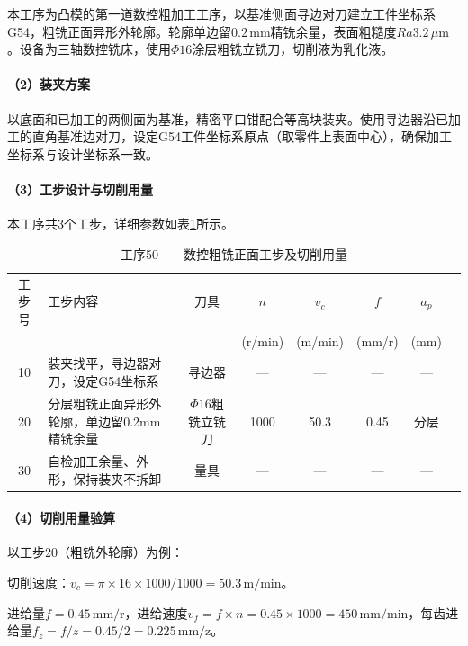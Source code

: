 \documentclass{xautCADreport}
\begin{document}
本工序为凸模的第一道数控粗加工工序，以基准侧面寻边对刀建立工件坐标系G54，粗铣正面异形外轮廓。轮廓单边留$0.2\,\mathrm{mm}$精铣余量，表面粗糙度$Ra3.2\,\mu\mathrm{m}$。设备为三轴数控铣床，使用$\Phi16$涂层粗铣立铣刀，切削液为乳化液。

\paragraph{（2）装夹方案}

以底面和已加工的两侧面为基准，精密平口钳配合等高块装夹。使用寻边器沿已加工的直角基准边对刀，设定G54工件坐标系原点（取零件上表面中心），确保加工坐标系与设计坐标系一致。

\paragraph{（3）工步设计与切削用量}

本工序共3个工步，详细参数如表\ref{tab:op50_punch}所示。

\begin{table}[H]
  \centering
  \caption{工序50——数控粗铣正面工步及切削用量}
  \label{tab:op50_punch}
  \small
  \setlength{\tabcolsep}{5pt}
  \begin{tabular}{cp{4cm}cccccc}
    \toprule
    工步号 & 工步内容 & 刀具 & \multicolumn{1}{c}{$n$} & \multicolumn{1}{c}{$v_c$} & \multicolumn{1}{c}{$f$} & \multicolumn{1}{c}{$a_p$} \\
    & & & (r/min) & (m/min) & (mm/r) & (mm) \\
    \midrule
    10 & 装夹找平，寻边器对刀，设定G54坐标系 & 寻边器 & — & — & — & — \\
    20 & 分层粗铣正面异形外轮廓，单边留0.2mm精铣余量 & $\Phi16$粗铣立铣刀 & 1000 & 50.3 & 0.45 & 分层 \\
    30 & 自检加工余量、外形，保持装夹不拆卸 & 量具 & — & — & — & — \\
    \bottomrule
  \end{tabular}
\end{table}

\paragraph{（4）切削用量验算}

以工步20（粗铣外轮廓）为例：

切削速度：$v_c = \pi \times 16 \times 1000 / 1000 = 50.3\,\mathrm{m/min}$。

进给量$f = 0.45\,\mathrm{mm/r}$，进给速度$v_f = f \times n = 0.45 \times 1000 = 450\,\mathrm{mm/min}$，每齿进给量$f_z = f / z = 0.45 / 2 = 0.225\,\mathrm{mm/z}$。
\end{document}
